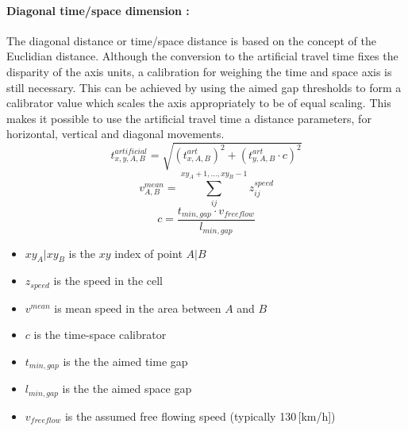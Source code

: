 \paragraph{Diagonal time/space dimension :} The diagonal distance or time/space distance is based on the concept of the Euclidian distance. Although the conversion to the artificial travel time fixes the disparity of the axis units, a calibration for weighing the time and space axis is still necessary. This can be achieved by using the aimed gap thresholds to form a calibrator value which scales the axis appropriately to be of equal scaling. This makes it possible to use the artificial travel time a distance parameters, for horizontal, vertical and diagonal movements.
\begin{equation}
	t_{x,y,A,B}^{artificial} = \sqrt{(t_{x,A,B}^{art})^2 + (t_{y,A,B}^{art} \cdot c)^2}
\end{equation}
\begin{equation}
	v_{A,B}^{mean} = \sum_{ij}^{xy_A + 1,...,xy_B - 1} z_{ij}^{speed}
\end{equation}
\begin{equation}
	c = \frac{t_{min,gap} \cdot v_{freeflow}}{l_{min,gap}}
\end{equation}
\begin{itemize}
	\setlength\itemsep{0.1em}	
	\item[] $xy_A | xy_B$ is the $xy$ index of point $A | B$
	\item[] $z_{speed}$ is the speed in the cell
	\item[] $v^{mean}$ is mean speed in the area between $A$ and $B$
	\item[] $c$ is the time-space calibrator
	\item[] $t_{min,gap}$ is the the aimed time gap
	\item[] $l_{min,gap}$ is the the aimed space gap
	\item[] $v_{freeflow}$ is the assumed free flowing speed (typically 130\,[km/h])
\end{itemize}

